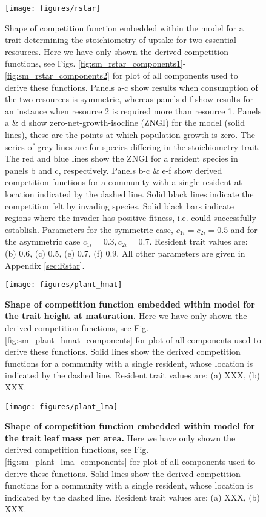 \documentclass[a4paper,11pt]{article}
\begin{document}
\begin{figure}[h]
  \centering
  \texttt{[image: figures/rstar]}
  \caption{Shape of competition function embedded within the \Rstar model
  for a trait determining the stoichiometry of uptake for two essential resources.
  Here we have only shown the derived  competition functions, see Figs.
  \ref{fig:sm_rstar_components1}-\ref{fig:sm_rstar_components2} for plot of all
  components used to derive these functions.
  Panels a-c show results when consumption of the two resources is symmetric, whereas
  panels d-f show results for an instance when resource 2 is required more than
  resource 1. Panels a \& d show zero-net-growth-isocline (ZNGI) for
  the  model  (solid lines), these are the points at which population growth is zero.
  The series of grey lines are for species differing in the stoichiometry trait.
  The red and blue lines show the ZNGI for a resident species in panels b and
  c, respectively. Panels b-c \& e-f show derived competition functions for a
  community with a single resident at location indicated by the dashed line.
  Solid black lines indicate the competition felt by invading species. Solid
  black bars indicate regions where the invader has positive fitness, i.e.
  could successfully establish. Parameters for the symmetric case, $c_{1i} =
  c_ {2i}=0.5$ and for the asymmetric case $c_{1i} = 0.3, c_ {2i}=0.7$. Resident
  trait values are: (b) 0.6, (c) 0.5, (e) 0.7, (f) 0.9. All other parameters
  are given in Appendix \ref{sec:Rstar}.
  \label{fig:Rstar}}
\end{figure}

\begin{figure}[h]
  \centering
  \texttt{[image: figures/plant\_hmat]}
  \caption{\textbf{Shape of competition function embedded within \plant model for
  the trait height at maturation.}
  Here we have only shown the derived  competition functions, see Fig.
  \ref{fig:sm_plant_hmat_components} for plot of all components used to derive these functions.
  Solid lines show the derived competition functions for a community with a
  single resident, whose location is indicated by the dashed line.
  Resident trait values are: (a) XXX, (b) XXX.
  \label{fig:plant_hmat}}
\end{figure}

\begin{figure}[h]
  \centering
  \texttt{[image: figures/plant\_lma]}
  \caption{\textbf{Shape of competition function embedded within \plant model for
  the trait leaf mass per area.}
  Here we have only shown the derived  competition functions, see Fig.
  \ref{fig:sm_plant_lma_components} for plot of all components used to derive these functions.
  Solid lines show the derived competition functions for a community with a
  single resident, whose location is indicated by the dashed line.
  Resident trait values are: (a) XXX, (b) XXX.
  \label{fig:plant_lma}}
\end{figure}
\end{document}
